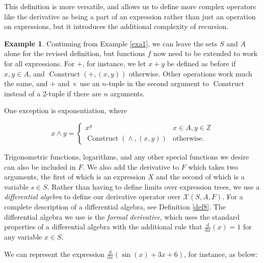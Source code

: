 \documentclass{article}
\theoremstyle{definition}
\newtheorem{exa}[thm]{Example}
\DeclareMathOperator{\pow}{\wedge}
\DeclareMathOperator{\construct}{Construct}
\begin{document}
This definition is more versatile, and allows us to define more complex operators like the derivative as being a part of an expression rather than just an operation on expressions, but it introduces the additional complexity of recursion.

\begin{exa} \label{exa2}
    Continuing from Example \ref{exa1}, we can leave the sets $S$ and $A$ alone for the revised definition, but functions $f$ now need to be extended to work for all expressions. For $+$, for instance, we let $x + y$ be defined as before if $x,y \in A$, and $\construct(+, (x,y))$ otherwise. Other operations work much the same, and $+$ and $\times$ use an $n$-tuple in the second argument to $\construct$ instead of a 2-tuple if there are $n$ arguments.
    
    One exception is exponentiation, where
    
    \begin{equation*}
        x \pow y = \begin{cases} x^y & x \in A, y \in \mathbb{Z}\\
                    \construct(\pow, (x,y)) & \text{otherwise}.
                    \end{cases}
    \end{equation*}
    

Trigonometric functions, logarithms, and any other special functions we desire can also be included in $F$. We also add the derivative to $F$ which takes two arguments, the first of which is an expression $X$ and the second of which is a variable $s \in S$. Rather than having to define limits over expression trees, we use a \emph{differential algebra} to define our derivative operator over $\mathcal{X}(S,A,F)$. For a complete description of a differential algebra, see Definition \ref{def8}. The differential algebra we use is the \emph{formal derivative}, which uses the standard properties of a differential algebra with the additional rule that $\frac{\mathrm{d}}{\mathrm{d}x}(x)=1$ for any variable $x \in S$.


We can represent the expression $\frac{\mathrm{d}}{\mathrm{d}x} (\sin (x) + 3x+6)$, for instance, as below:


\begin{figure}[H]
\centering
{}
\end{figure}
\end{exa}
\end{document}

